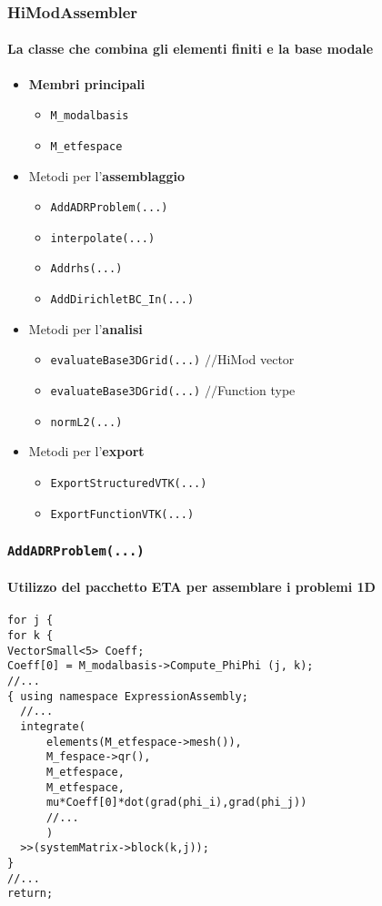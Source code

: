 \begin{frame}
 \frametitle{HiModAssembler}
 \framesubtitle{La classe che combina gli elementi finiti e la base modale}
 \begin{itemize}
  \item \textbf{Membri principali}
  \begin{itemize}
   \item \texttt{M\_modalbasis}
   \item \texttt{M\_etfespace}
  \end{itemize}

  \item Metodi per l'\textbf{assemblaggio}
  \begin{itemize}
   \item \texttt{AddADRProblem(...)}
   \item \texttt{interpolate(...)}
   \item \texttt{Addrhs(...)}
   \item \texttt{AddDirichletBC\_In(...)}
  \end{itemize}

  \item Metodi per l'\textbf{analisi}
  \begin{itemize}
   \item \texttt{evaluateBase3DGrid(...)} \textcolor{green!50!black}{$//$HiMod vector}
   \item \texttt{evaluateBase3DGrid(...)} \textcolor{green!50!black}{$//$Function type}
   \item \texttt{normL2(...)}
  \end{itemize}

  \item Metodi per l'\textbf{export}
  \begin{itemize}
   \item \texttt{ExportStructuredVTK(...)}
   \item \texttt{ExportFunctionVTK(...)}
  \end{itemize}

 \end{itemize}

\end{frame}
\begin{frame}[fragile]
 \frametitle{\texttt{AddADRProblem(...)}}
 \framesubtitle{Utilizzo del pacchetto ETA per assemblare i problemi 1D}
 \begin{lstlisting}[style=general]
for j {
for k {
VectorSmall<5> Coeff;
Coeff[0] = M_modalbasis->Compute_PhiPhi (j, k);
//...
{ using namespace ExpressionAssembly;
  //...
  integrate(
      elements(M_etfespace->mesh()),
      M_fespace->qr(),
      M_etfespace,
      M_etfespace,
      mu*Coeff[0]*dot(grad(phi_i),grad(phi_j))
      //...
      )
  >>(systemMatrix->block(k,j));
}
//...
return;
\end{lstlisting}
\end{frame}